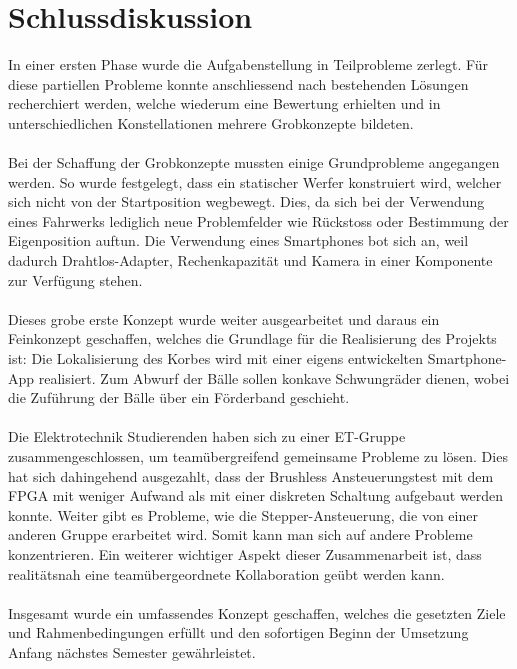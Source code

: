 \section{Schlussdiskussion}
In einer ersten Phase wurde die Aufgabenstellung in Teilprobleme zerlegt. Für diese partiellen 
Probleme konnte anschliessend nach bestehenden Lösungen recherchiert werden, welche wiederum 
eine Bewertung erhielten und in unterschiedlichen Konstellationen mehrere Grobkonzepte bildeten.\\
\\
Bei der Schaffung der Grobkonzepte mussten einige Grundprobleme angegangen werden. So wurde 
festgelegt, dass ein statischer Werfer konstruiert wird, welcher sich nicht von der Startposition 
wegbewegt. Dies, da sich bei der Verwendung eines Fahrwerks lediglich neue Problemfelder wie 
Rückstoss oder Bestimmung der Eigenposition auftun. Die Verwendung eines Smartphones bot sich 
an, weil dadurch Drahtlos-Adapter, Rechenkapazität und Kamera in einer Komponente zur Verfügung 
stehen. \\
\\
Dieses grobe erste Konzept wurde weiter ausgearbeitet und daraus ein Feinkonzept geschaffen, 
welches die Grundlage für die Realisierung des Projekts ist: Die Lokalisierung des Korbes wird 
mit einer eigens entwickelten Smartphone-App realisiert. Zum Abwurf der Bälle sollen konkave 
Schwungräder dienen, wobei die Zuführung der Bälle über ein Förderband 
geschieht. \\
\\
Die Elektrotechnik Studierenden haben sich zu einer ET-Gruppe zusammengeschlossen, um 
teamübergreifend gemeinsame Probleme zu lösen. Dies hat sich dahingehend ausgezahlt, dass 
der Brushless Ansteuerungstest mit dem FPGA mit weniger Aufwand als mit einer diskreten Schaltung 
aufgebaut werden konnte. Weiter gibt es Probleme, wie die Stepper-Ansteuerung, die von einer anderen 
Gruppe erarbeitet wird. Somit kann man sich auf andere Probleme konzentrieren. Ein weiterer wichtiger 
Aspekt dieser Zusammenarbeit ist, dass realitätsnah eine teamübergeordnete Kollaboration geübt werden 
kann.\\
\\
Insgesamt wurde ein umfassendes Konzept geschaffen, welches die gesetzten Ziele und 
Rahmenbedingungen erfüllt und den sofortigen Beginn der Umsetzung Anfang nächstes Semester 
gewährleistet.